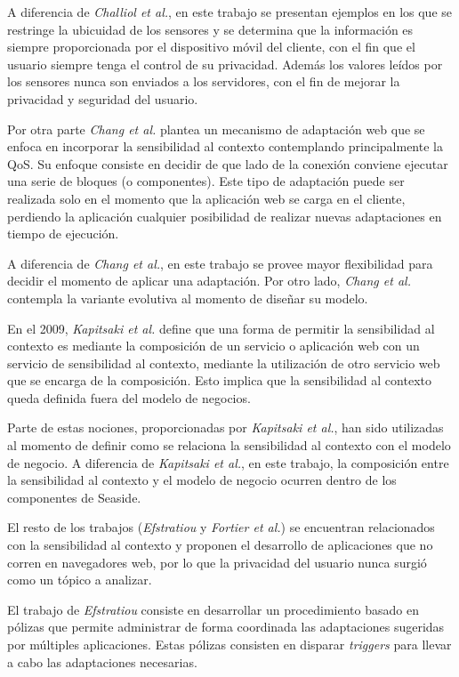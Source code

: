 A diferencia de \emph{Challiol et al.}, en este trabajo se presentan ejemplos en los que se restringe la ubicuidad de los sensores y se determina que la información es siempre proporcionada por el dispositivo móvil del cliente, con el fin que el usuario siempre tenga el control de su privacidad. Además los valores leídos por los sensores nunca son enviados a los servidores, con el fin de mejorar la privacidad y seguridad del usuario.

Por otra parte \emph{Chang et al.}\cite{Chang07} plantea un mecanismo de adaptación web que se enfoca en incorporar la sensibilidad al contexto contemplando principalmente la QoS. Su enfoque consiste en decidir de que lado de la conexión conviene ejecutar una serie de bloques (o componentes). Este tipo de adaptación puede ser realizada solo en el momento que la aplicación web se carga en el cliente, perdiendo la aplicación cualquier posibilidad de realizar nuevas adaptaciones en tiempo de ejecución.

A diferencia de \emph{Chang et al.}, en este trabajo se provee mayor flexibilidad para decidir el momento de aplicar una adaptación. Por otro lado, \emph{Chang et al.} contempla la variante evolutiva al momento de diseñar su modelo.

En el 2009, \emph{Kapitsaki et al.}\cite{Kapitsaki09} define que una forma de permitir la sensibilidad al contexto es mediante la composición de un servicio o aplicación web con un servicio de sensibilidad al contexto, mediante la utilización de otro servicio web que se encarga de la composición. Esto implica que la sensibilidad al contexto queda definida fuera del modelo de negocios.

Parte de estas nociones, proporcionadas por \emph{Kapitsaki et al.}, han sido utilizadas al momento de definir como se relaciona la sensibilidad al contexto con el modelo de negocio. A diferencia de \emph{Kapitsaki et al.}, en este trabajo, la composición entre la sensibilidad al contexto y el modelo de negocio ocurren dentro de los componentes de Seaside.

El resto de los trabajos (\emph{Efstratiou}\cite{Efstratiou04} y \emph{Fortier et al.}\cite{Fortier09}) se encuentran relacionados con la sensibilidad al contexto y proponen el desarrollo de aplicaciones que no corren en navegadores web, por lo que la privacidad del usuario nunca surgió como un tópico a analizar.

El trabajo de \emph{Efstratiou}\cite{Efstratiou04} consiste en desarrollar un procedimiento basado en pólizas que permite administrar de forma coordinada las adaptaciones sugeridas por múltiples aplicaciones. Estas pólizas consisten en disparar \emph{triggers} para llevar a cabo las adaptaciones necesarias.

